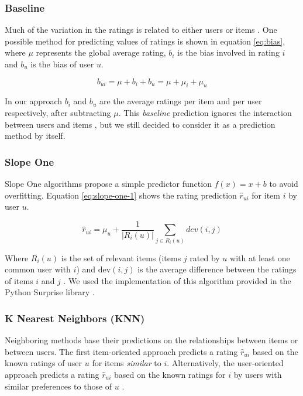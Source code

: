 \documentclass[10pt,conference,compsocconf]{IEEEtran}
\begin{document}
    \subsubsection{Baseline} %
    \label{ssub:baseline}
      Much of the variation in the ratings is related to either users or items \cite{koren2009matrix}. One possible method for predicting values of ratings is shown in equation \ref{eq:bias}, where $\mu$ represents the global average rating, $b_i$ is the bias involved in rating $i$ and $b_u$ is the bias of user $u$.

      \begin{equation}
        \label{eq:bias}
        b_{ui} = \mu + b_i + b_u = \mu + \mu_i + \mu_u
      \end{equation}

      In our approach $b_i$ and $b_u$ are the average ratings per item and per user respectively, after subtracting $\mu$. This \emph{baseline} prediction ignores the interaction between users and items \cite{koren2009matrix}, but we still decided to consider it as a prediction method by itself.

    \subsubsection{Slope One} %
    \label{ssub:slope_one}
      Slope One algorithms propose a simple predictor function $f(x) = x + b$ to avoid overfitting. Equation \ref{eq:slope-one-1} shows the rating prediction $\hat{r}_{ui}$ for item $i$ by user $u$.

      \begin{equation}
          \label{eq:slope-one-1}
          \hat{r}_{ui} = \mu_u + \frac{1}{|R_i(u)|} \sum_{j \in R_i(u)} dev(i,j)
      \end{equation}

      Where $R_i(u)$ is the set of relevant items (items $j$ rated by $u$ with at least one common user with $i$) and $\text{dev}(i,j)$ is the average difference between the ratings of items $i$ and $j$ \cite{lemire2005slope}. We used the implementation of this algorithm provided in the Python Surprise library \cite{surprise}.

    \subsubsection{K Nearest Neighbors (KNN)} %
    \label{ssub:k_nearest_neighbors}
      Neighboring methods base their predictions on the relationships between items or between users. The first item-oriented approach predicts a rating $\hat{r}_{ui}$ based on the known ratings of user $u$ for items \emph{similar} to $i$. Alternatively, the user-oriented approach predicts a rating $\hat{r}_{ui}$ based on the known ratings for $i$ by users with similar preferences to those of $u$ \cite{koren2009matrix, koren2010factor}.
\end{document}
